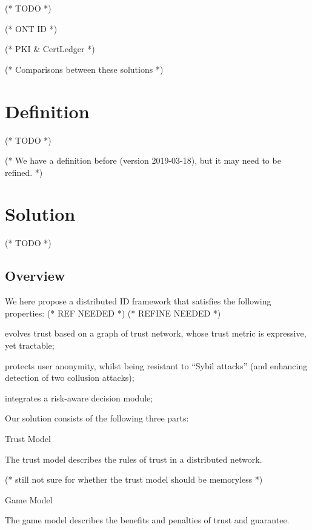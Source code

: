 \documentclass{article}
\begin{document}
(* TODO *)



(* ONT ID *)



(* PKI $\&$ CertLedger *)



(* Comparisons between these solutions *)


\section{Definition}



(* TODO *)



(* We have a definition before (version 2019-03-18), but it may need to be refined. *)


\section{Solution}



(* TODO *)


\subsection{Overview}



We here propose a distributed ID framework that satisfies the following properties: (* REF NEEDED *) (* REFINE NEEDED *)

evolves trust based on a graph of trust network, whose trust metric is expressive, yet tractable;

protects user anonymity, whilst being resistant to {``}Sybil attacks{''} (and enhancing detection of two collusion attacks);

integrates a risk-aware decision module;



Our solution consists of the following three parts:

Trust Model



The trust model describes the rules of trust in a distributed network.



(* still not sure for whether the trust model should be memoryless *)

Game Model



The game model describes the benefits and penalties of trust and guarantee.
\end{document}

